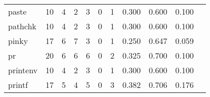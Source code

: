 \begin{longtable}{lp{1.20cm}p{1.20cm}p{1.20cm}p{1.20cm}p{1.20cm}p{1.20cm}p{1.20cm}p{1.20cm}p{1.20cm}p{1.20cm}}
paste     &                                    10 &                                                  4 &                                                  2 &                                                  3 &                                                  0 &                                                  1 &                                         0.300 &                                              0.600 &                                              0.100 \\
pathchk   &                                    10 &                                                  4 &                                                  2 &                                                  3 &                                                  0 &                                                  1 &                                         0.300 &                                              0.600 &                                              0.100 \\
pinky     &                                    17 &                                                  6 &                                                  7 &                                                  3 &                                                  0 &                                                  1 &                                         0.250 &                                              0.647 &                                              0.059 \\
pr        &                                    20 &                                                  6 &                                                  6 &                                                  6 &                                                  0 &                                                  2 &                                         0.325 &                                              0.700 &                                              0.100 \\
printenv  &                                    10 &                                                  4 &                                                  2 &                                                  3 &                                                  0 &                                                  1 &                                         0.300 &                                              0.600 &                                              0.100 \\
printf    &                                    17 &                                                  5 &                                                  4 &                                                  5 &                                                  0 &                                                  3 &                                         0.382 &                                              0.706 &                                              0.176 \\

\end{longtable}

